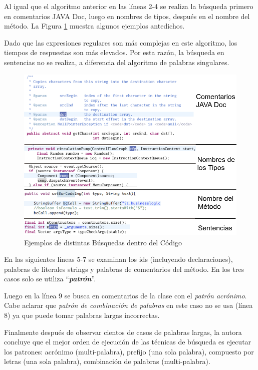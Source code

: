 Al igual que el algoritmo anterior en las líneas 2-4 se realiza la búsqueda primero en comentarios JAVA Doc, luego en nombres de tipos, después en el nombre del método. La Figura \ref{exp3} muestra algunos ejemplos antedichos.

Dado que las expresiones regulares son más complejas en este algoritmo, los tiempos de respuestas son más elevados. Por esta razón, la búsqueda en sentencias no se realiza, a diferencia del algoritmo de palabras singulares.

\begin{figure}[t] %
\centerline{%
\includegraphics[scale=0.7]{./cap3/exp_3.png}
}
\caption{Ejemplos de distintas Búsquedas dentro del Código}
\label{exp3}
\end{figure}

En las siguientes líneas 5-7 se examinan los ids (incluyendo declaraciones), palabras de literales strings y palabras de comentarios del método. En los tres casos solo se utiliza “\textit{\textbf{patrón}}”.

Luego en la línea 9 se busca en comentarios de la clase con el \textit{patrón acrónimo}. Cabe aclarar que \textit{patrón de combinación de palabras} en este caso no se usa (línea 8) ya que puede tomar palabras largas incorrectas.

Finalmente después de observar cientos de casos de palabras largas, la autora \cite{EZH08} concluye que el mejor orden de ejecución de las técnicas de búsqueda es ejecutar los patrones: acrónimo (multi-palabra), prefijo (una sola palabra), compuesto por letras (una sola palabra), combinación de palabras (multi-palabra).

